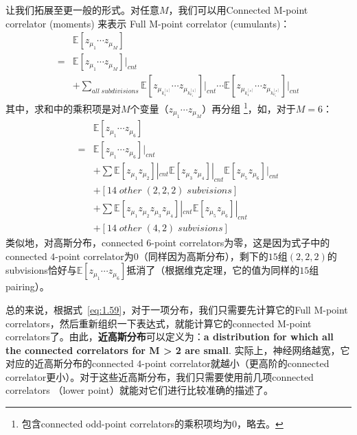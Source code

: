 让我们拓展至更一般的形式。对任意$M$，我们可以用Connected M-point correlator (moments) 来表示 Full M-point correlator (cumulants)：
\begin{equation}
    \begin{split}
        \label{eq:1.59}
        & \mathbb{E}[z_{\mu_1}\cdots z_{\mu_M}] \\
        = &  
        \mathbb{E}[z_{\mu_1}\cdots z_{\mu_M}]|_{cnt} \\
        & + \sum_{all\;subdivisions}{
            \mathbb{E}\left[
                z_{\mu_{k_{1}^{[1]}}} \cdots z_{\mu_{k_{\nu_1}^{[1]}}}
            \right]\bigg |_{cnt}
        }
        \cdots
        {
            \mathbb{E}\left[
                z_{\mu_{k_{1}^{[s]}}} \cdots z_{\mu_{k_{\nu_s}^{[s]}}}
            \right]\bigg |_{cnt}
        }
    \end{split}
\end{equation}
其中，求和中的乘积项是对$M$个变量（$z_{\mu_1}\cdots z_{\mu_M}$）再分组 \footnote{ 包含connected odd-point correlators的乘积项均为$0$，略去。}，如，对于$M=6$：
\begin{equation}
    \begin{split}
        & \mathbb{E}[z_{\mu_1}\cdots z_{\mu_6}] \\
        = &  
        \mathbb{E}[z_{\mu_1}\cdots z_{\mu_6}] |_{cnt}  \\
        & + \sum{
            \mathbb{E}[ z_{\mu_1}z_{\mu_2}] |_{cnt}
            \mathbb{E}[ z_{\mu_3}z_{\mu_4}] |_{cnt}
            \mathbb{E}[ z_{\mu_5}z_{\mu_6}] |_{cnt}
        } \\
        & + [14\;other\;(2,2,2)\;subvisions] \\
        & + \sum{
            \mathbb{E}[ z_{\mu_1}z_{\mu_2}z_{\mu_3}z_{\mu_4}] |_{cnt}
            \mathbb{E}[ z_{\mu_5}z_{\mu_6}] |_{cnt} 
        } \\
        & + [14\;other\;(4,2)\;subvisions] 
    \end{split}
\end{equation}
类似地，对高斯分布，connected $6$-point correlators为零，这是因为式子中的connected $4$-point correlator为$0$（同样因为高斯分布），剩下的$15$组$(2,2,2)$的subvisions恰好与$\mathbb{E}[z_{\mu_1}\cdots z_{\mu_6}]$抵消了（根据维克定理，它的值为同样的$15$组pairing）。

总的来说，根据式~\eqref{eq:1.59}，对于一项分布，我们只需要先计算它的Full M-point correlators，然后重新组织一下表达式，就能计算它的connected M-point correlators了。由此，\textbf{近高斯分布}可以定义为：\textbf{a distribution for which all the connected correlators for M > 2 are small}. 实际上，神经网络越宽，它对应的近高斯分布的connected $4$-point correlator就越小（更高阶的connected correlator更小）。对于这些近高斯分布，我们只需要使用前几项connected correlators （lower point）就能对它们进行比较准确的描述了。


